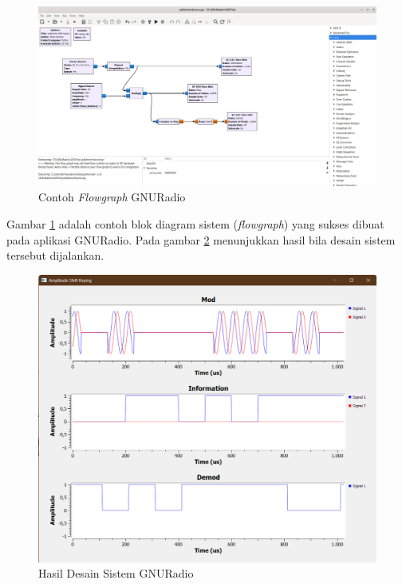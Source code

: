 \begin{figure}
	\begin{center}
		\includegraphics[scale=0.35]{pics/bab2/blokDiagramGRC.png} 
		\caption[Contoh \textit{Flowgraph} GNURadio]{Contoh \textit{Flowgraph} GNURadio}
		\label{pic:contohBlokGRC}
	\end{center}
\end{figure}

Gambar \ref{pic:contohBlokGRC} adalah contoh blok diagram sistem (\textit{flowgraph}) yang sukses dibuat pada aplikasi GNURadio. Pada gambar \ref{pic:contohRunGRC} menunjukkan hasil bila desain sistem tersebut dijalankan.

\begin{figure}
	\begin{center}
		\includegraphics[scale=0.4]{pics/bab2/contohRunGRC.png} 
		\caption[Hasil Desain Sistem GNURadio]{Hasil Desain Sistem GNURadio}
		\label{pic:contohRunGRC}
	\end{center}
\end{figure}



